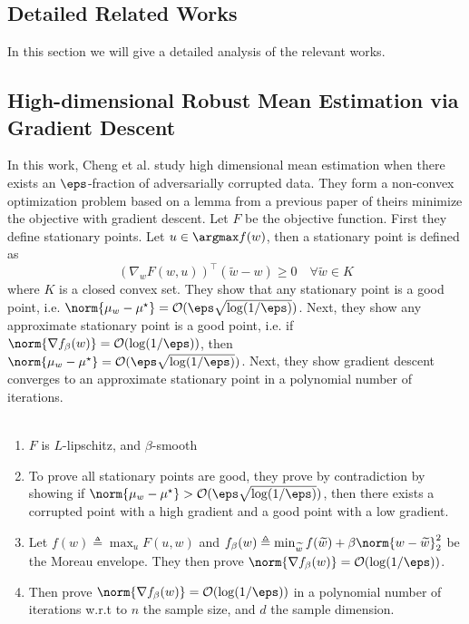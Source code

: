 \documentclass{article} %
\theoremstyle{plain}
\theoremstyle{definition}
\theoremstyle{remark}
\begin{document}
\begin{appendices}
	\clearpage
	\section{Detailed Related Works}
	In this section we will give a detailed analysis of the relevant works. 
	\subsection{High-dimensional Robust Mean Estimation via Gradient Descent \cite{cheng:2020}}
	In this work, Cheng et al. study high dimensional mean estimation when there exists an $\eps$-fraction of adversarially corrupted data. They form a non-convex optimization problem based on a lemma from a previous paper of theirs minimize the objective with gradient descent. Let $F$ be the objective function. First they define stationary points. Let $u \in \argmax f(w)$, then a stationary point is defined as
	\begin{equation}
		\left(\nabla_w F(w,u)\right)^{\top}(\widetilde{w}-w) \geq 0 \quad \forall \widetilde{w} \in K 
		\label{eq:cheng-stationary-point}
	\end{equation}
	where $K$ is a closed convex set. They show that any stationary point is a good point, i.e. $\norm{\mu_w - \mu^\star} = \mathcal{O}(\eps\sqrt{\log(1/\eps)})$. Next, they show any approximate stationary point is a good point, i.e. if $\norm{\nabla f_{\beta}(w)} = \mathcal{O}(\log(1/\eps))$, then $\norm{\mu_w - \mu^{\star}} = \mathcal{O}(\eps \sqrt{\log(1/\eps)})$. Next, they show gradient descent converges to an approximate stationary point in a polynomial number of iterations. \\\\
	\begin{enumerate}
		\item $F$ is $L$-lipschitz, and $\beta$-smooth
		\item To prove all stationary points are good, they prove by contradiction by showing if $\norm{\mu_w - \mu^{\star}} > \mathcal{O}(\eps \sqrt{\log(1/\eps)})$, then there exists a corrupted point with a high gradient and a good point with a low gradient.  
		\item Let $f(w) \triangleq \max_{u}F(u,w)$ and $f_{\beta}(w) \triangleq \min_{\widetilde{w}}f(\widetilde{w}) + \beta\norm{w - \widetilde{w}}_2^2$ be the Moreau envelope. They then prove $\norm{\nabla f_{\beta}(w)} = \mathcal{O}(\log(1/\eps))$.
		\item Then prove $\norm{\nabla f_{\beta}(w)} = \mathcal{O}(\log(1/\eps))$ in a polynomial number of iterations w.r.t to $n$ the sample size, and $d$ the sample dimension.  
	\end{enumerate}
	

\end{appendices}
\end{document}
